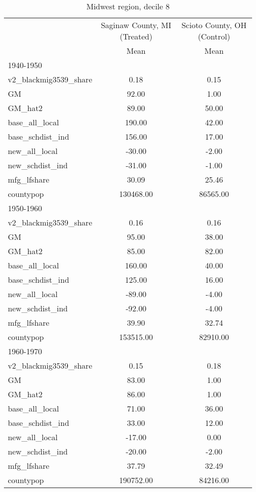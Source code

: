 \begin{table}[htbp]\centering
\def\sym#1{\ifmmode^{#1}\else\(^{#1}\)\fi}
\caption{Midwest region, decile 8 \label{tab1}}
\begin{tabular}{l*{2}{c}}
\toprule
                    &\multicolumn{1}{c}{Saginaw County, MI (Treated)}&\multicolumn{1}{c}{Scioto County, OH (Control)}\\
                    &        Mean&        Mean\\
\midrule
1940-1950           &            &            \\
v2\_blackmig3539\_share&        0.18&        0.15\\
GM                  &       92.00&        1.00\\
GM\_hat2             &       89.00&       50.00\\
base\_all\_local      &      190.00&       42.00\\
base\_schdist\_ind    &      156.00&       17.00\\
new\_all\_local       &      -30.00&       -2.00\\
new\_schdist\_ind     &      -31.00&       -1.00\\
mfg\_lfshare         &       30.09&       25.46\\
countypop           &   130468.00&    86565.00\\
\midrule
1950-1960           &            &            \\
v2\_blackmig3539\_share&        0.16&        0.16\\
GM                  &       95.00&       38.00\\
GM\_hat2             &       85.00&       82.00\\
base\_all\_local      &      160.00&       40.00\\
base\_schdist\_ind    &      125.00&       16.00\\
new\_all\_local       &      -89.00&       -4.00\\
new\_schdist\_ind     &      -92.00&       -4.00\\
mfg\_lfshare         &       39.90&       32.74\\
countypop           &   153515.00&    82910.00\\
\midrule
1960-1970           &            &            \\
v2\_blackmig3539\_share&        0.15&        0.18\\
GM                  &       83.00&        1.00\\
GM\_hat2             &       86.00&        1.00\\
base\_all\_local      &       71.00&       36.00\\
base\_schdist\_ind    &       33.00&       12.00\\
new\_all\_local       &      -17.00&        0.00\\
new\_schdist\_ind     &      -20.00&       -2.00\\
mfg\_lfshare         &       37.79&       32.49\\
countypop           &   190752.00&    84216.00\\
\bottomrule
\end{tabular}
\end{table}
